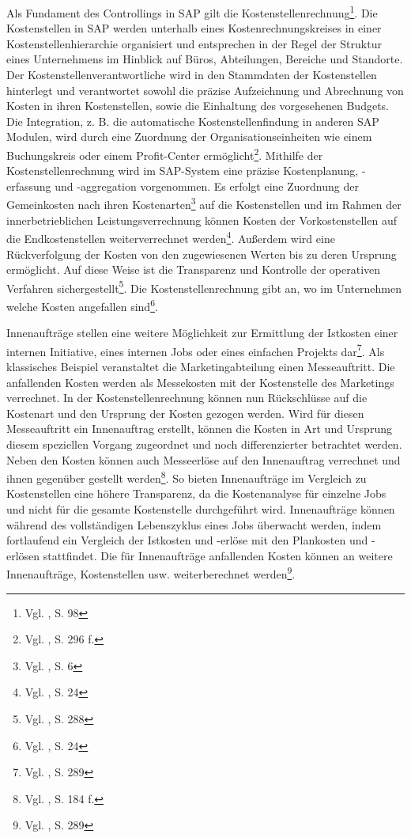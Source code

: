 Als Fundament des Controllings in SAP gilt die Kostenstellenrechnung\footnote{Vgl. \cite{Klein2010}, S. 98}.
Die Kostenstellen in SAP werden unterhalb eines Kostenrechnungskreises in einer Kostenstellenhierarchie organisiert und entsprechen in der Regel der Struktur eines Unternehmens im Hinblick auf Büros, Abteilungen, Bereiche und Standorte. Der Kostenstellenverantwortliche wird in den Stammdaten der Kostenstellen hinterlegt und verantwortet sowohl die präzise Aufzeichnung und Abrechnung von Kosten in ihren Kostenstellen, sowie die Einhaltung des vorgesehenen Budgets. Die Integration, z. B. die automatische Kostenstellenfindung in anderen SAP Modulen, wird durch eine Zuordnung der Organisationseinheiten wie einem Buchungskreis oder einem Profit-Center ermöglicht\footnote{Vgl. \cite{Patel2009}, S. 296 f.}.
Mithilfe der Kostenstellenrechnung wird im SAP-System eine präzise Kostenplanung, -erfassung und -aggregation vorgenommen. Es erfolgt eine Zuordnung der Gemeinkosten nach ihren Kostenarten\footnote{Vgl. \cite{SAPOMCEL2001}, S. 6} auf die Kostenstellen und im Rahmen der innerbetrieblichen Leistungsverrechnung können Kosten der Vorkostenstellen auf die Endkostenstellen weiterverrechnet werden\footnote{Vgl. \cite{Friedl2008}, S. 24}. Außerdem wird eine Rückverfolgung der Kosten von den zugewiesenen Werten bis zu deren Ursprung ermöglicht. 
Auf diese Weise ist die Transparenz und Kontrolle der operativen Verfahren sichergestellt\footnote{Vgl. \cite{Patel2009}, S. 288}. 
Die Kostenstellenrechnung gibt an, wo im Unternehmen welche Kosten angefallen sind\footnote{Vgl. \cite{Friedl2008}, S. 24}.

Innenaufträge stellen eine weitere Möglichkeit zur Ermittlung der Istkosten einer internen Initiative, eines internen Jobs oder eines einfachen Projekts dar\footnote{Vgl. \cite{Patel2009}, S. 289}. Als klassisches Beispiel veranstaltet die Marketingabteilung einen Messeauftritt. Die anfallenden Kosten werden als Messekosten mit der Kostenstelle des Marketings verrechnet. In der Kostenstellenrechnung können nun Rückschlüsse auf die Kostenart und den Ursprung der Kosten gezogen werden. Wird für diesen Messeauftritt ein Innenauftrag erstellt, können die Kosten in Art und Ursprung diesem speziellen Vorgang zugeordnet und noch differenzierter betrachtet werden. Neben den Kosten können auch Messeerlöse auf den Innenauftrag verrechnet und ihnen gegenüber gestellt werden\footnote{Vgl. \cite{Klein2010}, S. 184 f.}. 
So bieten Innenaufträge im Vergleich zu Kostenstellen eine höhere Transparenz, da die Kostenanalyse für einzelne Jobs und nicht für die gesamte Kostenstelle durchgeführt wird. Innenaufträge können während des vollständigen Lebenszyklus eines Jobs überwacht werden, indem fortlaufend ein Vergleich der Istkosten und -erlöse mit den Plankosten und -erlösen stattfindet. Die für Innenaufträge anfallenden Kosten können an weitere Innenaufträge, Kostenstellen usw. weiterberechnet werden\footnote{Vgl. \cite{Patel2009}, S. 289}.

